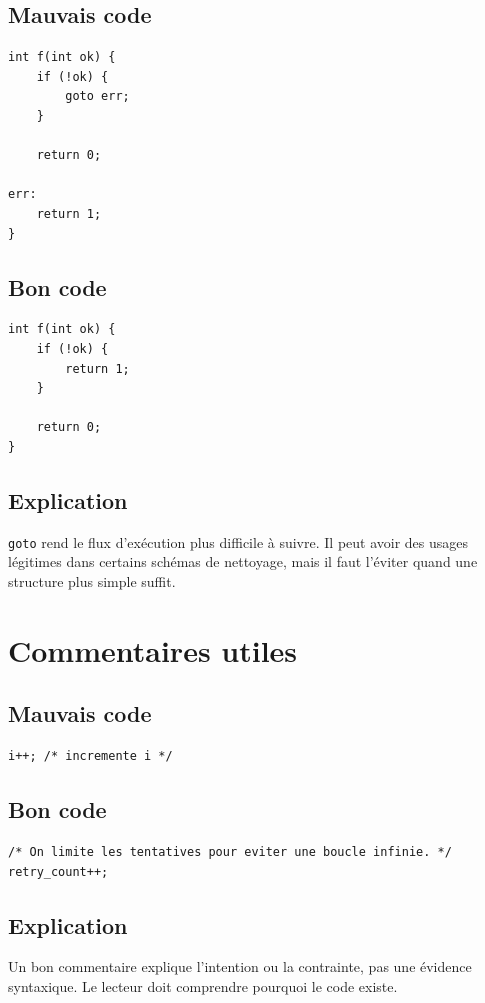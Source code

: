 \documentclass[a4paper,11pt]{report}
\begin{document}
\section{Mauvais code}
\begin{lstlisting}
int f(int ok) {
    if (!ok) {
        goto err;
    }

    return 0;

err:
    return 1;
}
\end{lstlisting}

\section{Bon code}
\begin{lstlisting}
int f(int ok) {
    if (!ok) {
        return 1;
    }

    return 0;
}
\end{lstlisting}

\section{Explication}
\texttt{goto} rend le flux d'exécution plus difficile à suivre.
Il peut avoir des usages légitimes dans certains schémas de nettoyage, mais il faut l'éviter quand une structure plus simple suffit.

\chapter{Commentaires utiles}

\section{Mauvais code}
\begin{lstlisting}
i++; /* incremente i */
\end{lstlisting}

\section{Bon code}
\begin{lstlisting}
/* On limite les tentatives pour eviter une boucle infinie. */
retry_count++;
\end{lstlisting}

\section{Explication}
Un bon commentaire explique l'intention ou la contrainte, pas une évidence syntaxique.
Le lecteur doit comprendre pourquoi le code existe.
\end{document}
